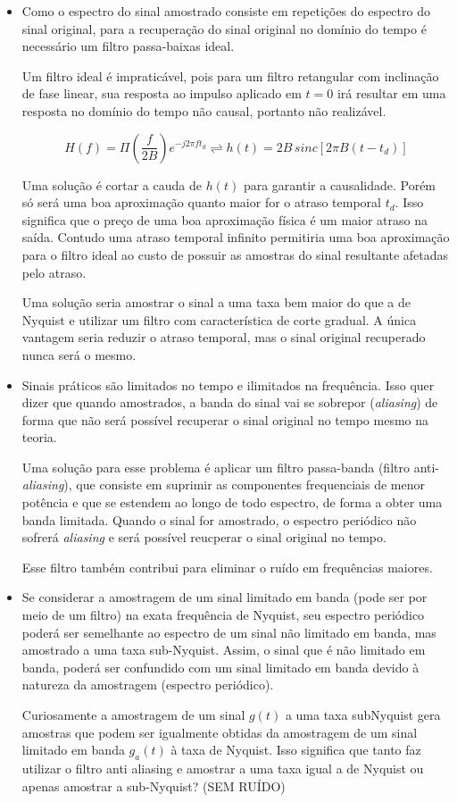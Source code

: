 \begin{itemize}
    \item Como o espectro do sinal amostrado consiste em repetições do espectro do sinal original, para a recuperação do sinal original no domínio do tempo é necessário um filtro passa-baixas ideal.
    
    Um filtro ideal é impraticável, pois para um filtro retangular com inclinação de fase linear, sua resposta ao impulso aplicado em $t=0$ irá resultar em uma resposta no domínio do tempo não causal, portanto não realizável. 
    
    \begin{equation}
        H(f) = \Pi \left(\frac{f}{2B}\right)e^{-j2\pi ft_d} \rightleftharpoons h(t) = 2B \, sinc[2\pi B(t-t_d)]
    \end{equation}
    
    Uma solução é cortar a cauda de $h(t)$ para garantir a causalidade. Porém só será uma boa aproximação quanto maior for o atraso temporal $t_d$. Isso significa que o preço de uma boa aproximação física é um maior atraso na saída. Contudo uma atraso temporal infinito permitiria uma boa aproximação para o filtro ideal ao custo de possuir as amostras do sinal resultante afetadas pelo atraso.
    
    Uma solução seria amostrar o sinal a uma taxa bem maior do que a de Nyquist e utilizar um filtro com característica de corte gradual. A única vantagem seria reduzir o atraso temporal, mas o sinal original recuperado nunca será o mesmo.

    \item Sinais práticos são limitados no tempo e ilimitados na frequência. Isso quer dizer que quando amostrados, a banda do sinal vai se sobrepor (\textit{aliasing}) de forma que não será possível recuperar o sinal original no tempo mesmo na teoria.
    
    Uma solução para esse problema é aplicar um filtro passa-banda (filtro anti-\textit{aliasing}), que consiste em suprimir as componentes frequenciais de menor potência e que se estendem ao longo de todo espectro, de forma a obter uma banda limitada. Quando o sinal for amostrado, o espectro periódico não sofrerá \textit{aliasing} e será possível reucperar o sinal original no tempo.
    
    Esse filtro também contribui para eliminar o ruído em frequências maiores.
    
    \item Se considerar a amostragem de um sinal limitado em banda (pode ser por meio de um filtro) na exata frequência de Nyquist, seu espectro periódico poderá ser semelhante ao espectro de um sinal não limitado em banda, mas amostrado a uma taxa sub-Nyquist. Assim, o sinal que é não limitado em banda, poderá ser confundido com um sinal limitado em banda devido à natureza da amostragem (espectro periódico).
    
    Curiosamente a amostragem de um sinal $g(t)$ a uma taxa sub­Nyquist gera amostras que podem ser igualmente obtidas da amostragem de um sinal limitado em banda $g_a(t)$ à taxa de Nyquist. Isso significa que tanto faz utilizar o filtro anti aliasing e amostrar a uma taxa igual a de Nyquist ou apenas amostrar a sub-Nyquist? (SEM RUÍDO)
\end{itemize}
